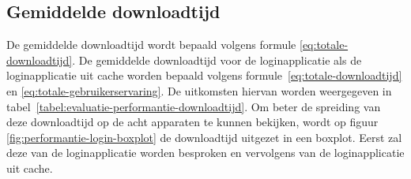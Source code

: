 
\subsection{Gemiddelde downloadtijd}
\label{sec:evaluatie-downloadtijd}

De gemiddelde downloadtijd wordt bepaald volgens formule \ref{eq:totale-downloadtijd}.
De gemiddelde downloadtijd voor de loginapplicatie als de loginapplicatie uit cache worden bepaald volgens formule~\ref{eq:totale-downloadtijd} en \ref{eq:totale-gebruikerservaring}.
De uitkomsten hiervan worden weergegeven in tabel~\ref{tabel:evaluatie-performantie-downloadtijd}.
Om beter de spreiding van deze downloadtijd op de acht apparaten te kunnen bekijken, wordt op figuur \ref{fig:performantie-login-boxplot} de downloadtijd uitgezet in een boxplot.
Eerst zal deze van de loginapplicatie worden besproken en vervolgens van de loginapplicatie uit cache.

\begin{table}
\centering
{}
\caption{Downloadtijd van loginapplicatie voor \st{}~(\sta), \kendo{}~(\kendoa), \jqm{}~(\jqma) en \lungo{}~(\lungoa). Minder is beter.}
\label{tabel:evaluatie-performantie-downloadtijd}
\end{table}

